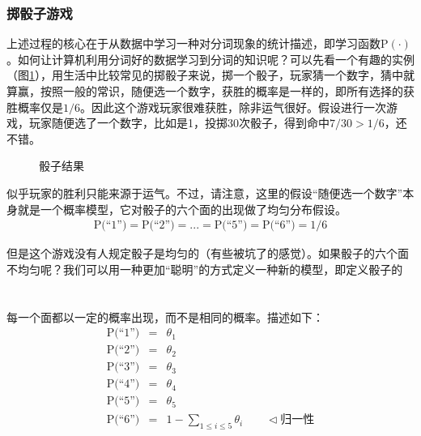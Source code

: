 
\subsubsection{掷骰子游戏}

\parinterval 上述过程的核心在于从数据中学习一种对分词现象的统计描述，即学习函数$\textrm{P}(\cdot)$。如何让计算机利用分词好的数据学习到分词的知识呢？可以先看一个有趣的实例（图\ref{fig:2-11}），用生活中比较常见的掷骰子来说，掷一个骰子，玩家猜一个数字，猜中就算赢，按照一般的常识，随便选一个数字，获胜的概率是一样的，即所有选择的获胜概率仅是$1/6$。因此这个游戏玩家很难获胜，除非运气很好。假设进行一次游戏，玩家随便选了一个数字，比如是1，投掷30次骰子，得到命中$7/30 > 1/6$，还不错。
\vspace{-0.5em}

\begin{figure}[htp]
\centering

\caption{骰子结果}
\label{fig:2-11}
\end{figure}

\vspace{-0.5em}
\parinterval 似乎玩家的胜利只能来源于运气。不过，请注意，这里的假设``随便选一个数字''本身就是一个概率模型，它对骰子的六个面的出现做了均匀分布假设。
\begin{eqnarray}
\textrm{P(``1'')}=\textrm{P(``2'')}=...=\textrm{P(``5'')}=\textrm{P(``6'')}=1/6
\label{eq:2-17}
\end{eqnarray}

\vspace{-0.5em}
\parinterval 但是这个游戏没有人规定骰子是均匀的（有些被坑了的感觉）。如果骰子的六个面不均匀呢？我们可以用一种更加``聪明''的方式定义一种新的模型，即定义骰子的\\ \\ \\每一个面都以一定的概率出现，而不是相同的概率。描述如下：
\begin{eqnarray}
\textrm{P(``1'')} &=&\theta_1 \nonumber \\
\textrm{P(``2'')} &=&\theta_2 \nonumber \\
\textrm{P(``3'')} &=&\theta_3 \nonumber \\
\textrm{P(``4'')} &=&\theta_4 \nonumber \\
\textrm{P(``5'')} &=&\theta_5 \nonumber \\
\textrm{P(``6'')} &=&1-\sum_{1 \leq i \leq 5}\theta_i \qquad \lhd \textrm {归一性}
\label{eq:2-18}
\end{eqnarray}

